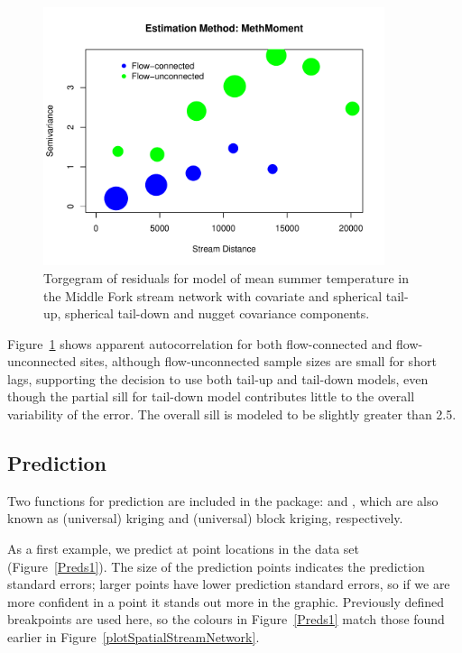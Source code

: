 \documentclass[nojss]{jss}
\begin{document}
\begin{figure}[htbp]
  \begin{center}
    \includegraphics[keepaspectratio=true, width = 100mm]{Figures/jss984Fig-TorgRes}
    \caption{Torgegram of residuals for model  of mean summer
      temperature in the Middle Fork stream network with  covariate and spherical tail-up, spherical tail-down and nugget covariance components.\label{TorgRes}}
  \end{center}
\end{figure}

Figure~\ref{TorgRes} shows apparent autocorrelation for both
flow-connected and flow-unconnected sites, although flow-unconnected sample sizes are small for short lags, supporting the decision to use both tail-up and tail-down models, even though the partial sill for tail-down model contributes little to the overall variability of the error.  The overall sill is modeled to be slightly greater than 2.5. 


\subsection{Prediction}

Two functions for prediction are included in the  package:
 and , which are also known as
(universal) kriging and (universal) block kriging, respectively.

As a first example, we predict at point locations in the
 data set (Figure~\ref{Preds1}). The size of the
prediction points indicates the prediction standard errors; larger
points have lower prediction standard errors, so if we are more
confident in a point it stands out more in the graphic. Previously
defined breakpoints are used here, so the colours in
Figure~\ref{Preds1} match those found earlier in
Figure~\ref{plotSpatialStreamNetwork}.
\end{document}
